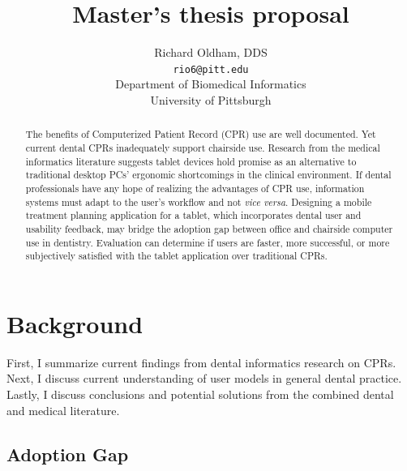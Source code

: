 \documentclass[11pt]{article}
\begin{document}
\title{Master's thesis proposal}
\author{Richard Oldham, DDS\\
		\texttt{rio6@pitt.edu}\\
		Department of Biomedical Informatics\\
		University of Pittsburgh}
\maketitle

\begin{abstract}
The benefits of Computerized Patient Record (CPR) use are well documented. Yet current dental CPRs inadequately support chairside use. Research from the medical informatics literature suggests tablet devices hold promise as an alternative to traditional desktop PCs' ergonomic shortcomings in the clinical environment. If dental professionals have any hope of realizing the advantages of CPR use, information systems must adapt to the user's workflow and not \emph{vice versa}. Designing a mobile treatment planning application for a tablet, which incorporates dental user and usability feedback, may bridge the adoption gap between office and chairside computer use in dentistry. Evaluation can determine if users are faster, more successful, or more subjectively satisfied with the tablet application over traditional CPRs.
\end{abstract}
\tableofcontents
\newpage

\section{Background}
First, I summarize current findings from dental informatics research on CPRs. Next, I discuss current understanding of user models in general dental practice. Lastly, I discuss conclusions and potential solutions from the combined dental and medical literature.

\subsection{Adoption Gap}
\label{Adoption Gap}
\end{document}

